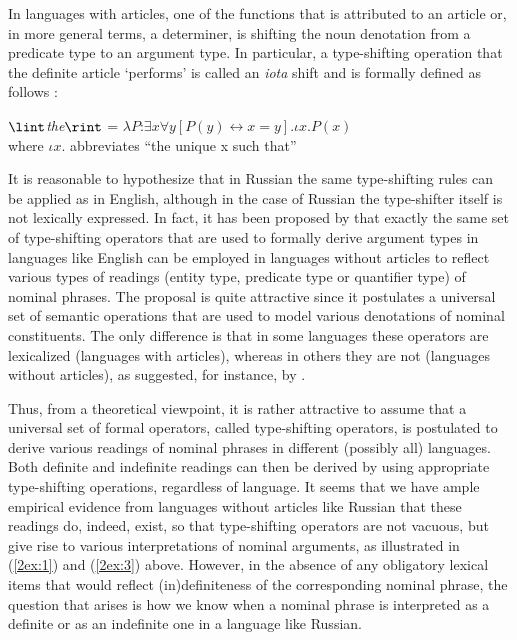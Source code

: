 \documentclass[output=paper]{langsci/langscibook}
\begin{document}
In languages with articles, one of the functions that is attributed to an article or, in more general terms, a determiner, is shifting the noun denotation from a predicate type to an argument type. In particular, a type-shifting operation that the definite article `performs' is called an {\emph{iota}} shift and is formally defined as follows \citep[see][998]{heim:11}:

\begin{exe}
\ex\label{2ex:4}
$\lint${\emph{the}}$\rint$ = $\lambda P$:$\exists x\forall y[P(y) \leftrightarrow x=y].\iota x.P(x)$\\
where $\iota x.$ abbreviates ``the unique x such that''
\end{exe}

{
It is reasonable to hypothesize that in Russian the same type-shifting rules can be applied as in English, although in the case of Russian the type-shifter itself is not lexically expressed. In fact, it has been proposed by \cite{chierchia:98} that exactly the same set of type-shifting operators that are used to formally derive argument types in languages like English can be employed in languages without articles to reflect various types of readings (entity type, predicate type or quantifier type) of nominal phrases. The proposal is quite attractive since it postulates a universal set of semantic operations that are used to model various denotations of nominal constituents. The only difference is that in some languages these operators are lexicalized (languages with articles), whereas in others they are not (languages without articles), as suggested, for instance, by \cite{dayal:04}.
}

Thus, from a theoretical viewpoint, it is rather attractive to assume that a universal set of formal operators, called type-shifting operators, is postulated to derive various readings of nominal phrases in different (possibly all) languages. Both definite and indefinite readings can then be derived by using appropriate type-shifting operations, regardless of language. It seems that we have ample empirical evidence from languages without articles like Russian that these readings do, indeed, exist, so that type-shifting operators are not vacuous, but give rise to various interpretations of nominal arguments, as illustrated in (\ref{2ex:1}) and (\ref{2ex:3}) above. However, in the absence of any obligatory lexical items that would reflect (in)definiteness of the corresponding nominal phrase, the question that arises is how we know when a nominal phrase is interpreted as a definite or as an indefinite one in a language like Russian.
\end{document}
